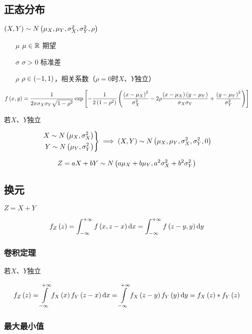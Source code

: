\documentclass{article}
\begin{document}
\subsection{正态分布}

$\left(X,Y\right)\sim N\left(\mu_X,\mu_Y,\sigma_X^2,\sigma_Y^2,\rho\right)$

\begin{enumerate}
    \item [$\mu$] $\mu\in\mathbb R$ 期望
    \item [$\sigma$] $\sigma>0$ 标准差
    \item [$\rho$] $\rho\in\left(-1,1\right)$，相关系数（$\rho=0$时$X$、$Y$独立）
\end{enumerate}

\[f\left(x,y\right)=\frac1{2\pi\sigma_X\sigma_Y\sqrt{1-\rho^2}}
    \exp\left[-\frac1{2\left(1-\rho^2\right)}
        \left(\frac{{\left(x-\mu_X\right)}^2}{\sigma_X^2}
            -2\rho\frac{\left(x-\mu_X\right)\left(y-\mu_Y\right)}{\sigma_X\sigma_Y}
            +\frac{{\left(y-\mu_Y\right)}^2}{\sigma_Y^2}\right)\right]\]

若$X$、$Y$独立

\[\left.\begin{aligned}
        X\sim N\left(\mu_X,\sigma_X^2\right) \\
        Y\sim N\left(\mu_Y,\sigma_Y^2\right)
    \end{aligned}\right\}\implies
    \left(X,Y\right)\sim N\left(\mu_X,\mu_Y,\sigma_X^2,\sigma_Y^2,0\right)\]


\[Z=aX+bY\sim N\left(a\mu_X+b\mu_Y,a^2\sigma_X^2+b^2\sigma_Y^2\right)\]

\subsection{换元}

$Z=X+Y$

\[f_Z\left(z\right)
    =\int_{-\infty}^{+\infty}f\left(x,z-x\right)\mathrm d x
    =\int_{-\infty}^{+\infty}f\left(z-y,y\right)\mathrm d y\]

\subsubsection{卷积定理}

若$X$、$Y$独立

\[f_Z\left(z\right)
    =\int\limits_{-\infty}^{+\infty} f_X\left(x\right)f_Y\left(z-x\right)\mathrm d x
    =\int\limits_{-\infty}^{+\infty} f_X\left(z-y\right)f_Y\left(y\right)\mathrm d y
    =f_X\left(z\right)\ast f_Y\left(z\right)\]

\subsubsection{最大最小值}
\end{document}
